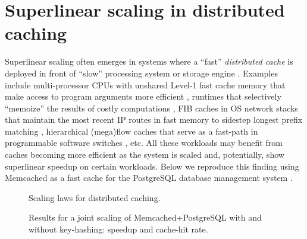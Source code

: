 \section{Superlinear scaling in distributed caching}\label{sec:dist-caching}

Superlinear scaling often emerges in systems where a ``fast'' \emph{distributed cache} is deployed in front of ``slow'' processing system or storage engine \cite{scalability-analyzed, sdn-analytitcs, dobb-2}.  Examples include multi-processor CPUs with unshared Level-1 fast cache memory that make access to program arguments more efficient \cite{7733347}, runtimes that selectively ``memoize'' the results of costly computations \cite{10.1109/TC.2005.119}, FIB caches in OS network stacks that maintain the most recent IP routes in fast memory to sidestep longest prefix matching \cite{rottenstreich2016optimal}, hierarchical (mega)flow caches that serve as a fast-path in programmable software switches \cite{188960}, etc. All these workloads may benefit from caches becoming more efficient as the system is scaled and, potentially, show superlinear speedup on certain workloads. Below we reproduce this finding using Memcached as a fast cache for the PostgreSQL database management system \cite{180324,10.5555/1012889.1012894, 179747, ghigoff2021bmc}.

\begin{figure*}[t]
  \begin{minipage}[t]{.35\linewidth}
    \centering%
    \caption{Scaling laws for distributed caching.}%
    \label{fig:dcache-analysis}%
  \end{minipage}
  \hspace{10pt}%
  \begin{minipage}[t]{.6\linewidth}
    \caption{Results for a joint scaling of Memcached+PostgreSQL with and without key-hashing: speedup and cache-hit rate.}%
    \label{fig:dist-cache-speedup}%
  \end{minipage}
\end{figure*}

